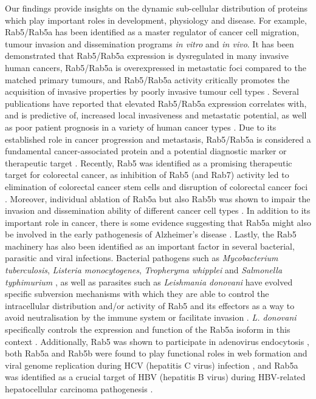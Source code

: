 \documentclass[12pt,english]{article}
\begin{document}
Our findings provide insights on the dynamic sub-cellular distribution of proteins which play important roles in development, physiology and disease. For example, Rab5/Rab5a has been identified as a master regulator of cancer cell migration, tumour invasion and dissemination programs \textit{in vitro} and \textit{in vivo}. It has been demonstrated that Rab5/Rab5a expression is dysregulated in many invasive human cancers, Rab5/Rab5a is overexpressed in metastatic foci compared to the matched primary tumours, and Rab5/Rab5a activity critically promotes the acquisition of invasive properties by poorly invasive tumour cell types \citep{Torres::2010,Liu::2011,Liu::2015, Mendoza::2013,Frittoli::2014,Diaz::2014, Saitoh::2017}. Several publications have reported that elevated Rab5/Rab5a expression correlates with, and is predictive of, increased local invasiveness and metastatic potential, as well as poor patient prognosis in a variety of human cancer types \citep{Yu::1999,Fukui::2007,Zhao::2010,Yang::2011,Mendoza::2013, Frittoli::2014,Diaz::2014, Igarashi::2017}. Due to its established role in cancer progression and metastasis, Rab5/Rab5a is considered a fundamental cancer-associated protein and a potential diagnostic marker or therapeutic target \citep{Frittoli::2014, Igarashi::2017}. Recently, Rab5 was identified as a promising therapeutic target for colorectal cancer, as inhibition of Rab5 (and Rab7) activity led to elimination of colorectal cancer stem cells and disruption of colorectal cancer foci \citep{Takeda::2019}. Moreover, individual ablation of Rab5a but also Rab5b was shown to impair the invasion and dissemination ability of different cancer cell types \citep{Frittoli::2014}. In addition to its important role in cancer, there is some evidence suggesting that Rab5a might also be involved in the early pathogenesis of Alzheimer's disease \citep{Cataldo::1997,Cataldo::2000, Rosenfeld::2001}. Lastly, the Rab5 machinery has also been identified as an important factor in several bacterial, parasitic and viral infections. Bacterial pathogens such as \textit{Mycobacterium tuberculosis}, \textit{Listeria monocytogenes}, \textit{Tropheryma whipplei} and \textit{Salmonella typhimurium} \citep{Madan::2008}, as well as parasites such as \textit{Leishmania donovani} have evolved specific subversion mechanisms with which they are able to control the intracellular distribution and/or activity of Rab5 and its effectors as a way to avoid neutralisation by the immune system or facilitate invasion \citep{Verma::2017}. \textit{L. donovani} specifically controls the expression and function of the Rab5a isoform in this context \citep{Verma::2017}. Additionally, Rab5 was shown to participate in adenovirus endocytosis \citep{Rauma::1999}, both Rab5a and Rab5b were found to play functional roles in web formation and viral genome replication during HCV (hepatitis C virus) infection \citep{Stone::2007}, and Rab5a was identified as a crucial target of HBV (hepatitis B virus) during HBV-related hepatocellular carcinoma  pathogenesis \citep{Sheng::2014}.
\end{document}
